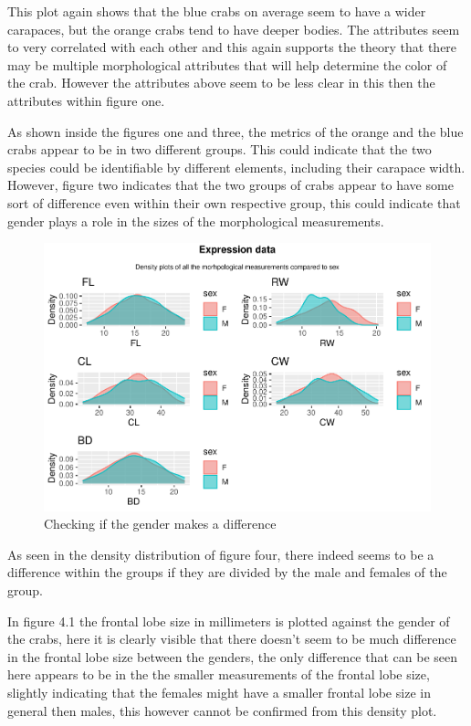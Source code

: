 \documentclass[
]{article}
\begin{document}
This plot again shows that the blue crabs on average seem to have a
wider carapaces, but the orange crabs tend to have deeper bodies. The
attributes seem to very correlated with each other and this again
supports the theory that there may be multiple morphological attributes
that will help determine the color of the crab. However the attributes
above seem to be less clear in this then the attributes within figure
one.

As shown inside the figures one and three, the metrics of the orange and
the blue crabs appear to be in two different groups. This could indicate
that the two species could be identifiable by different elements,
including their carapace width. However, figure two indicates that the
two groups of crabs appear to have some sort of difference even within
their own respective group, this could indicate that gender plays a role
in the sizes of the morphological measurements.

\newpage
\begin{figure}[H]

{\centering \includegraphics{CrabProject_files/figure-latex/figure4-1} 

}

\caption{Checking if the gender makes a difference}\label{fig:figure4}
\end{figure}

As seen in the density distribution of figure four, there indeed seems
to be a difference within the groups if they are divided by the male and
females of the group.

In figure 4.1 the frontal lobe size in millimeters is plotted against
the gender of the crabs, here it is clearly visible that there doesn't
seem to be much difference in the frontal lobe size between the genders,
the only difference that can be seen here appears to be in the the
smaller measurements of the frontal lobe size, slightly indicating that
the females might have a smaller frontal lobe size in general then
males, this however cannot be confirmed from this density plot.
\end{document}
